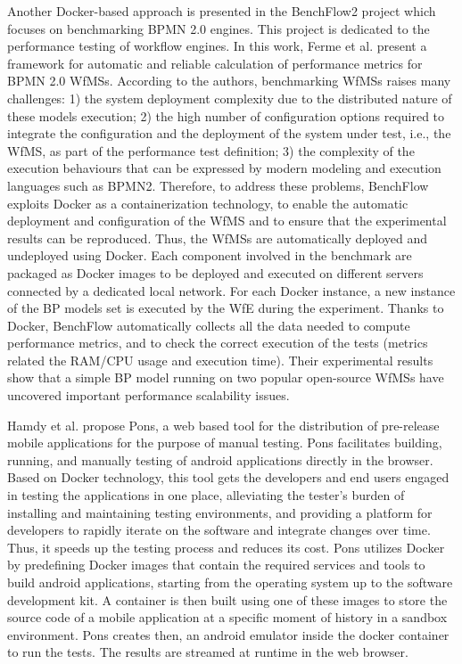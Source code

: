 Another Docker-based approach is presented in the BenchFlow2 project which focuses on benchmarking BPMN 2.0 engines\cite{ferme2015framework}. This project is dedicated to the performance testing of workflow engines. In this work, Ferme et al. present a framework for automatic and reliable calculation of performance metrics for BPMN 2.0 WfMSs. 
According to the authors, benchmarking WfMSs raises many challenges: 1) the system deployment complexity due to the distributed nature of these models execution; 2) the high number of configuration options required to integrate the configuration and the deployment of the system under test, i.e., the WfMS, as part of the performance test definition; 3) the complexity of the execution behaviours that can be expressed by modern modeling and execution languages such as BPMN2.
Therefore, to address these problems, BenchFlow exploits Docker as a containerization technology, to enable the automatic deployment and configuration of the WfMS and to ensure that the experimental results can be reproduced.
Thus, the WfMSs are automatically deployed and undeployed using Docker. Each component involved in the benchmark are packaged as Docker images
to be deployed and executed on different servers connected by a dedicated local
network. For each Docker instance, a new instance of the BP models set is executed by the WfE during the experiment.
Thanks to Docker, BenchFlow automatically collects all the data needed to compute performance metrics, and to check the correct execution of the tests (metrics related the RAM/CPU usage and execution time).
Their experimental results show that a simple BP model running on two popular
open-source WfMSs have uncovered important performance scalability issues. 

Hamdy et al.\cite{hamdy2016web} propose Pons, a web based tool for the distribution of pre-release mobile
applications for the purpose of manual testing. Pons facilitates building, running, and manually testing of android applications directly in the browser. 
Based on Docker technology, this tool gets the developers and end users engaged in testing the applications in one
place, alleviating the tester's burden of installing and maintaining testing environments, and providing a platform for developers to rapidly iterate on the software and integrate changes over time. Thus, it speeds up the testing process and reduces its cost.
Pons utilizes Docker by predefining Docker images that
contain the required services and tools to build android
applications, starting from the operating system up to the
software development kit. A container is then built using one of these images to store the source code of
a mobile application at a specific moment of history in a
sandbox environment. Pons creates then, an android emulator inside the docker container to run the tests. The results are streamed at runtime in the web browser.

